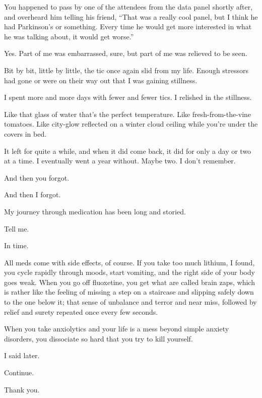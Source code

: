 \begin{paracol}{2}
\begin{leftcolumn}
\begin{ally}
You happened to pass by one of the attendees from the data panel shortly after, and overheard him telling his friend, ``That was a really cool panel, but I think he had Parkinson's or something. Every time he would get more interested in what he was talking about, it would get worse.''
\end{ally}
Yes. Part of me was embarrassed, sure, but part of me was relieved to be seen.
\newpage

\noindent Bit by bit, little by little, the tic once again slid from my life. Enough stressors had gone or were on their way out that I was gaining stillness.

I spent more and more days with fewer and fewer tics. I relished in the stillness.

\begin{ally}
Like that glass of water that's the perfect temperature. Like fresh-from-the-vine tomatoes. Like city-glow reflected on a winter cloud ceiling while you're under the covers in bed.
\end{ally}
It left for quite a while, and when it did come back, it did for only a day or two at a time. I eventually went a year without. Maybe two. I don't remember.

\begin{ally}
And then you forgot.
\end{ally}
And then I forgot.
\newpage

\noindent My journey through medication has been long and storied.

\begin{ally}
Tell me.
\end{ally}
In time.

All meds come with side effects, of course. If you take too much lithium, I found, you cycle rapidly through moods, start vomiting, and the right side of your body goes weak. When you go off fluoxetine, you get what are called brain zaps, which is rather like the feeling of missing a step on a staircase and slipping safely down to the one below it; that sense of unbalance and terror and near miss, followed by relief and surety repeated once every few seconds.

\begin{ally}
When you take anxiolytics and your life is a mess beyond simple anxiety disorders, you dissociate so hard that you try to kill yourself.
\end{ally}
I said later.

\begin{ally}
Continue.
\end{ally}
Thank you.


\end{leftcolumn}
\end{paracol}
